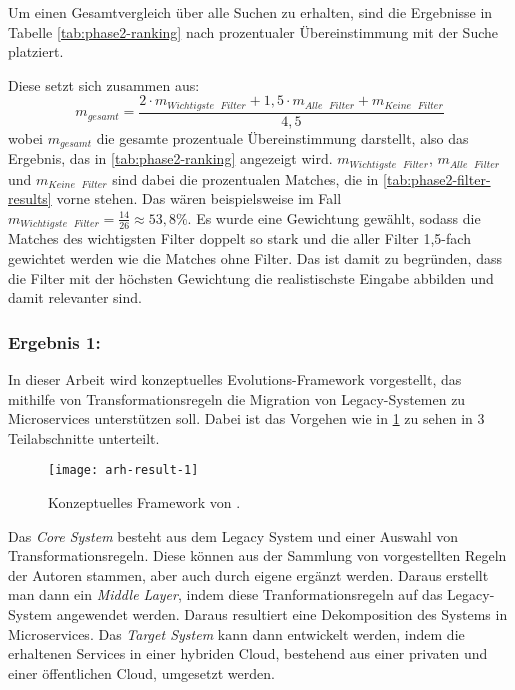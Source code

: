 Um einen Gesamtvergleich über alle Suchen zu erhalten, sind die Ergebnisse in Tabelle \cref{tab:phase2-ranking} nach prozentualer Übereinstimmung mit der Suche platziert.

Diese setzt sich zusammen aus:
\[
m_{gesamt} = \frac{2 \cdot m_{Wichtigste \text{ } Filter} + 1,5 \cdot  m_{Alle \text{ } Filter} +  m_{Keine \text{ } Filter}}{4,5}
\]
wobei $m_{gesamt}$ die gesamte prozentuale Übereinstimmung darstellt, also das Ergebnis, das in \cref{tab:phase2-ranking} angezeigt wird.
$m_{Wichtigste \text{ } Filter}$, $m_{Alle \text{ } Filter}$ und $m_{Keine \text{ } Filter}$ sind dabei die prozentualen Matches, die in \cref{tab:phase2-filter-results} vorne stehen.
Das wären beispielsweise im Fall  $m_{Wichtigste \text{ } Filter} = \frac{14}{26} \approx 53,8\%$.
Es wurde eine Gewichtung gewählt, sodass die Matches des wichtigsten Filter doppelt so stark und die aller Filter 1,5-fach gewichtet werden wie die Matches ohne Filter.
Das ist damit zu begründen, dass die Filter mit der höchsten Gewichtung die realistischste Eingabe abbilden und damit relevanter sind.

\subsubsection{Ergebnis 1: }

In dieser Arbeit wird konzeptuelles Evolutions-Framework vorgestellt, das mithilfe von Trans\-for\-ma\-tions\-re\-geln die Migration von Legacy-Systemen zu Microservices unterstützen soll.
Dabei ist das Vorgehen wie in \cref{fig:arh-result-1} zu sehen in 3 Teilabschnitte unterteilt.
\begin{figure}[!h]
	\centering
	\texttt{[image: arh-result-1]}
	\caption[Konzeptuelles Framework von ]{
		Konzeptuelles Framework von .
	}
	\label{fig:arh-result-1}
\end{figure}
Das \emph{Core System} besteht aus dem Legacy System und einer Auswahl von Transformationsregeln.
Diese können aus der Sammlung von vorgestellten Regeln der Autoren stammen, aber auch durch eigene ergänzt werden.
Daraus erstellt man dann ein \emph{Middle Layer}, indem diese Tranformationsregeln auf das Legacy-System angewendet werden.
Daraus resultiert eine Dekomposition des Systems in Microservices.
Das \emph{Target System} kann dann entwickelt werden, indem die erhaltenen Services in einer hybriden Cloud, bestehend aus einer privaten und einer öffentlichen Cloud, umgesetzt werden.

